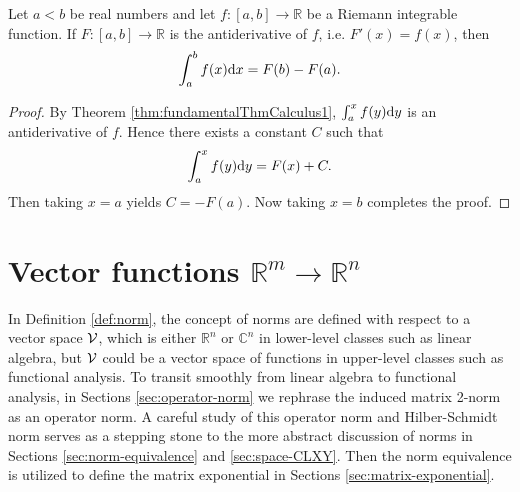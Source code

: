 \begin{thm}
  \label{thm:fundamentalThmCalculus2}
  Let $a<b$ be real numbers
  and let $f: [a,b]\rightarrow \mathbb{R}$
  be a Riemann integrable function.
  If $F:[a,b]\rightarrow\mathbb{R}$ is the antiderivative of $f$,
  i.e. $F'(x)=f(x)$,
  then
  \begin{equation}
    \label{eq:fundamentalThmCalculus2}
    \int_a^b f(x)\mathrm{d} x = F(b) - F(a).
  \end{equation}
\end{thm}
\begin{proof}
  By Theorem \ref{thm:fundamentalThmCalculus1},
  $\int_{a}^{x}f(y)\mathrm{d} y$ is an antiderivative of $f$.
  Hence there exists a constant $C$ such that
  \begin{displaymath}
    \int_{a}^{x}f(y)\mathrm{d} y = F(x)+C.
  \end{displaymath}
  Then taking $x=a$ yields $C=-F(a)$.
  Now taking $x=b$ completes the proof.
\end{proof}


\section{Vector functions
  $\mathbb{R}^m\rightarrow\mathbb{R}^n$}
\label{sec:sever-vari-diff}

\begin{rem} 
  In Definition \ref{def:norm},
  the concept of norms are defined with respect
  to a vector space ${\cal V}$,
  which is either $\mathbb{R}^n$ or $\mathbb{C}^n$
  in lower-level classes such as linear algebra,
  but ${\cal V}$ could be a vector space of functions
  in upper-level classes such as
  functional analysis.
  To transit smoothly from linear algebra
  to functional analysis,
  in Sections \ref{sec:operator-norm}
  we rephrase the induced matrix 2-norm
  as an operator norm.
  A careful study of this operator norm
  and Hilber-Schmidt norm
  serves as a stepping stone
  to the more abstract discussion of norms
  in Sections \ref{sec:norm-equivalence}
  and \ref{sec:space-CLXY}.
  Then the norm equivalence is utilized
  to define the matrix exponential
  in Sections \ref{sec:matrix-exponential}.
\end{rem}

